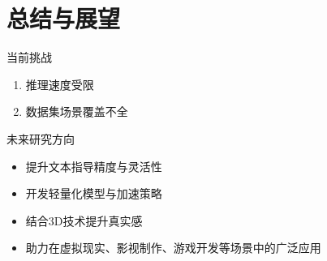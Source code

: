 \documentclass[
    fontset=fandol,
    xcolor=svgnames %
]{ctexbeamer}
\begin{document}
\section{总结与展望}
\begin{frame}
     \begin{block}{当前挑战}
        \begin{enumerate}
            \item 推理速度受限
            \item 数据集场景覆盖不全
        \end{enumerate}
    \end{block}

    \begin{alertblock}{未来研究方向}
        \begin{itemize}
            \item 提升文本指导精度与灵活性
            \item 开发轻量化模型与加速策略
            \item 结合3D技术提升真实感
        \end{itemize}
    \end{alertblock}

    \begin{examples}
        \begin{itemize}
            \item 助力在虚拟现实、影视制作、游戏开发等场景中的广泛应用
        \end{itemize}
    \end{examples}
\end{frame}
\end{document}
